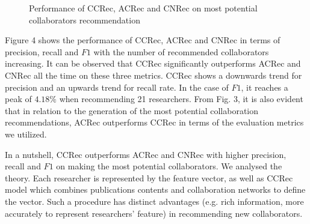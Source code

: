 \documentclass[review]{elsarticle}
\begin{document}
\begin{figure}
\centering
{}
\caption{Performance of CCRec, ACRec and CNRec on most potential collaborators recommendation}
\label{fig:3}       %
\end{figure}

Figure 4 shows the performance of CCRec, ACRec and CNRec in terms of precision, recall and $F1$ with the number of recommended collaborators increasing. It can be observed that CCRec significantly outperforms ACRec and CNRec all the time on these three metrics. CCRec shows a downwards trend for precision and an upwards trend for recall rate. In the case of $F1$, it reaches a peak of $4.18\%$ when recommending 21 researchers. From Fig. 3, it is also evident that in relation to the generation of the most potential collaboration recommendations, ACRec outperforms CCRec in terms of the evaluation metrics we utilized.

In a nutshell, CCRec outperforms ACRec and CNRec with higher precision, recall and $F1$ on making the most potential collaborators. We analysed the theory. Each researcher is represented by the feature vector, as well as CCRec model which combines publications contents and collaboration networks to define the vector. Such a procedure has distinct advantages (e.g. rich information, more accurately to represent researchers' feature) in recommending new collaborators.
\end{document}
